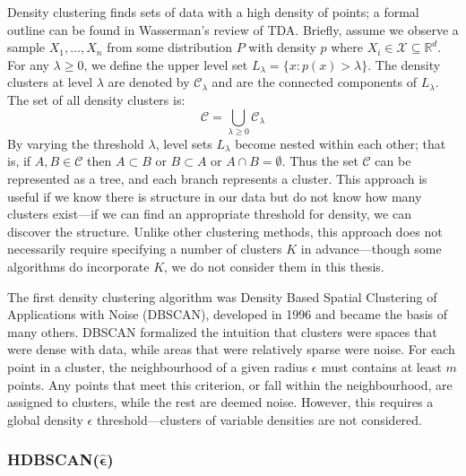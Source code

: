 Density clustering finds sets of data with a high density of points; a formal outline can be found in Wasserman's review of TDA\citep{wasserman_topological_2018}. Briefly, assume we observe a sample $X_{1}, \dots , X_{n}$ from some distribution $P$ with density $p$ where $X_{i} \in \mathcal{X} \subseteq \mathbb{R}^d$. For any $\lambda \ge 0$, we define the upper level set $L_{\lambda} = \{x: p(x) > \lambda \}$. The density clusters at level $\lambda$ are denoted by $\mathcal{C}_{\lambda}$ and are the connected components of $L_{\lambda}$. The set of all density clusters is:
$$ \mathcal{C} = \bigcup_{\lambda \ge 0} \mathcal{C}_{\lambda} $$
By varying the threshold $\lambda$, level sets $L_{\lambda}$ become nested within each other; that is, if $A, B \in \mathcal{C}$ then $A \subset B$ or $B \subset A$ or $A \cap B = \emptyset$. Thus the set $\mathcal{C}$ can be represented as a tree, and each branch represents a cluster. This approach is useful if we know there is structure in our data but do not know how many clusters exist---if we can find an appropriate threshold for density, we can discover the structure. Unlike other clustering methods, this approach does not necessarily require specifying a number of clusters $K$ in advance---though some algorithms do incorporate $K$, we do not consider them in this thesis.

The first density clustering algorithm was Density Based Spatial Clustering of Applications with Noise (DBSCAN), developed in 1996\citep{ester1996density} and became the basis of many others\citep{khan_dbscan_2014}. DBSCAN formalized the intuition that clusters were spaces that were dense with data, while areas that were relatively sparse were noise. For each point in a cluster, the neighbourhood of a given radius $\epsilon$ must contains at least $m$ points. Any points that meet this criterion, or fall within the neighbourhood, are assigned to clusters, while the rest are deemed noise. However, this requires a global density $\epsilon$ threshold---clusters of variable densities are not considered. 

\subsubsection{HDBSCAN(\texorpdfstring{$\mathbf{\hat{\epsilon}}$}{f})}

